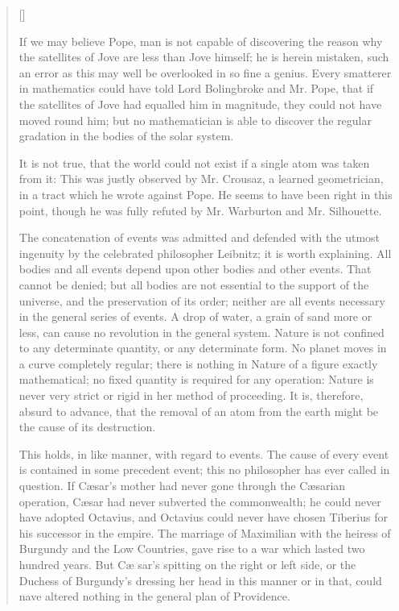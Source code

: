 \begin{verse}[\versewidth]
{If we may believe Pope, man is not capable of discovering the reason
why the satellites of Jove are less than Jove himself; he is herein
mistaken, such an error as this may well be overlooked in so fine a
genius. Every smatterer in mathematics could have told Lord
Bolingbroke and Mr. Pope, that if the satellites of Jove had equalled
him in magnitude, they could not have moved round him; but no
mathematician is able to discover the regular gradation in the bodies
of the solar system.

It is not true, that the world could not exist if a single atom was
taken from it: This was justly observed by Mr. Crousaz, a learned
geometrician, in a tract which he wrote against Pope. He seems to have
been right in this point, though he was fully refuted by Mr. Warburton
and Mr. Silhouette.

The concatenation of events was admitted and defended with the utmost
ingenuity by the celebrated philosopher Leibnitz; it is worth
explaining. All bodies and all events depend upon other bodies and
other events. That cannot be denied; but all bodies are not essential
to the support of the universe, and the preservation of its order;
neither are all events necessary in the general series of events. A
drop of water, a grain of sand more or less, can cause no revolution
in the general system. Nature is not confined to any determinate
quantity, or any determinate form. No planet moves in a curve
completely regular; there is nothing in Nature of a figure exactly
mathematical; no fixed quantity is required for any operation: Nature
is never very strict or rigid in her method of proceeding. It is,
therefore, absurd to advance, that the removal of an atom from the
earth might be the cause of its destruction.


This holds, in like manner, with regard to events. The cause of every
event is contained in some precedent event; this no philosopher has
ever called in question. If C\ae sar's mother had never gone through
the C\ae sarian operation, C\ae sar had never subverted the
commonwealth; he could never have adopted Octavius, and Octavius could
never have chosen Tiberius for his successor in the empire. The
marriage of Maximilian with the heiress of Burgundy and the Low
Countries, gave rise to a war which lasted two hundred years. But C\ae
sar's spitting on the right or left side, or the Duchess of Burgundy's
dressing her head in this manner or in that, could nave altered
nothing in the general plan of Providence.

}
\end{verse}
